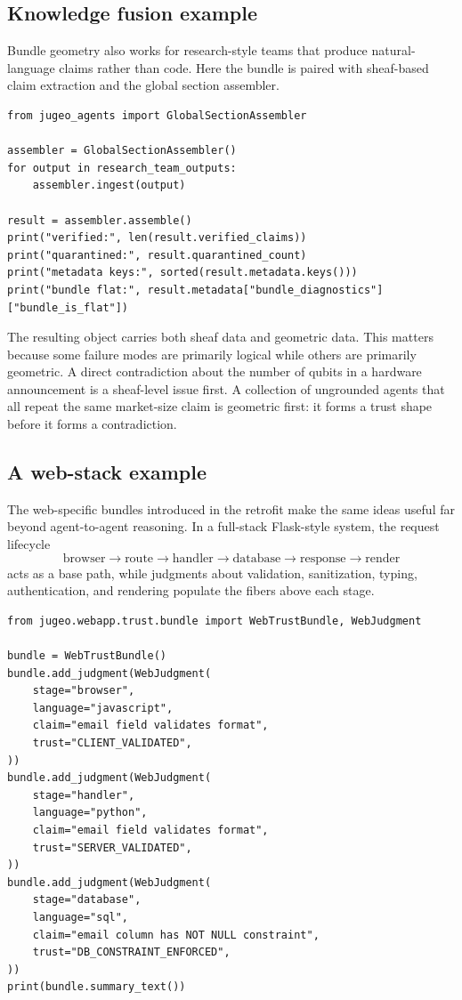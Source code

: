 \documentclass[11pt]{article}
\begin{document}
\subsection{Knowledge fusion example}

Bundle geometry also works for research-style teams that produce natural-language
claims rather than code.  Here the bundle is paired with sheaf-based claim
extraction and the global section assembler.

\begin{lstlisting}[style=jugeo-python,caption={Knowledge fusion with cohomology plus bundle diagnostics.},label={lst:fusion-example}]
from jugeo_agents import GlobalSectionAssembler

assembler = GlobalSectionAssembler()
for output in research_team_outputs:
    assembler.ingest(output)

result = assembler.assemble()
print("verified:", len(result.verified_claims))
print("quarantined:", result.quarantined_count)
print("metadata keys:", sorted(result.metadata.keys()))
print("bundle flat:", result.metadata["bundle_diagnostics"]["bundle_is_flat"])
\end{lstlisting}

The resulting object carries both sheaf data and geometric data.  This matters
because some failure modes are primarily logical while others are primarily
geometric.  A direct contradiction about the number of qubits in a hardware
announcement is a sheaf-level issue first.  A collection of ungrounded agents
that all repeat the same market-size claim is geometric first: it forms a trust
shape before it forms a contradiction.

\subsection{A web-stack example}

The web-specific bundles introduced in the retrofit make the same ideas useful
far beyond agent-to-agent reasoning.  In a full-stack Flask-style system, the
request lifecycle
\[
  \text{browser} \to \text{route} \to \text{handler} \to \text{database}
  \to \text{response} \to \text{render}
\]
acts as a base path, while judgments about validation, sanitization, typing,
authentication, and rendering populate the fibers above each stage.

\begin{lstlisting}[style=jugeo-python,caption={Web trust bundle example.},label={lst:web-bundle-example}]
from jugeo.webapp.trust.bundle import WebTrustBundle, WebJudgment

bundle = WebTrustBundle()
bundle.add_judgment(WebJudgment(
    stage="browser",
    language="javascript",
    claim="email field validates format",
    trust="CLIENT_VALIDATED",
))
bundle.add_judgment(WebJudgment(
    stage="handler",
    language="python",
    claim="email field validates format",
    trust="SERVER_VALIDATED",
))
bundle.add_judgment(WebJudgment(
    stage="database",
    language="sql",
    claim="email column has NOT NULL constraint",
    trust="DB_CONSTRAINT_ENFORCED",
))
print(bundle.summary_text())
\end{lstlisting}
\end{document}
